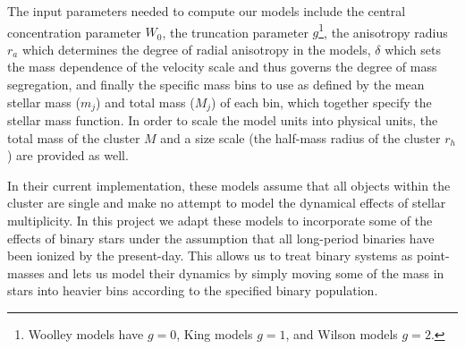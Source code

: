 The input parameters needed to compute our models include the central concentration parameter $W_0$,
the truncation parameter $g$\footnote{Woolley models \citep{Woolley1954} have $g=0$, King models
\citep{King1966} $g=1$, and Wilson models \citep{Wilson1975} $g=2$.}, the anisotropy radius $r_a$
which determines the degree of radial anisotropy in the models, $\delta$ which sets the mass
dependence of the velocity scale and thus governs the degree of mass segregation, and finally the
specific mass bins to use as defined by the mean stellar mass ($m_j$) and total mass ($M_j$) of each
bin, which together specify the stellar mass function. In order to scale the model units into
physical units, the total mass of the cluster $M$ and a size scale (the half-mass radius of the
cluster $r_h$) are provided as well.


In their current implementation, these models assume that all objects within the cluster are single
and make no attempt to model the dynamical effects of stellar multiplicity. In this project we adapt
these models to incorporate some of the effects of binary stars under the assumption that all
long-period binaries have been ionized by the present-day. This allows us to treat binary systems as
point-masses and lets us model their dynamics by simply moving some of the mass in  stars into
heavier bins according to the specified binary population.